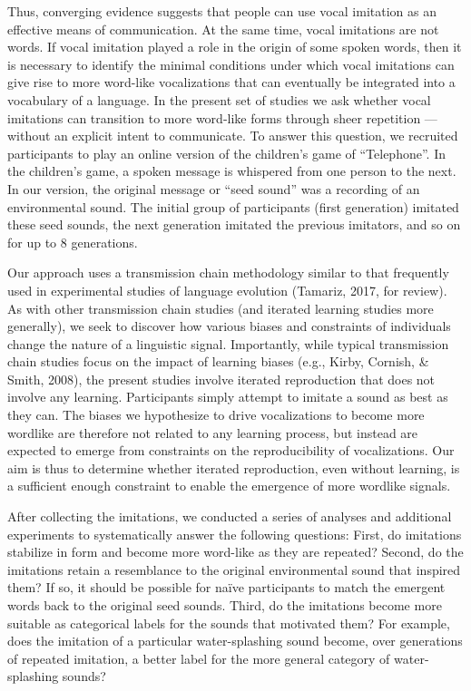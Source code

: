 \documentclass[english,floatsintext,man]{apa6}
\theoremstyle{definition}
\theoremstyle{definition}
\theoremstyle{definition}
\theoremstyle{remark}
\begin{document}
Thus, converging evidence suggests that people can use vocal imitation
as an effective means of communication. At the same time, vocal
imitations are not words. If vocal imitation played a role in the origin
of some spoken words, then it is necessary to identify the minimal
conditions under which vocal imitations can give rise to more word-like
vocalizations that can eventually be integrated into a vocabulary of a
language. In the present set of studies we ask whether vocal imitations
can transition to more word-like forms through sheer repetition ---
without an explicit intent to communicate. To answer this question, we
recruited participants to play an online version of the children's game
of \enquote{Telephone}. In the children's game, a spoken message is
whispered from one person to the next. In our version, the original
message or \enquote{seed sound} was a recording of an environmental
sound. The initial group of participants (first generation) imitated
these seed sounds, the next generation imitated the previous imitators,
and so on for up to 8 generations.

Our approach uses a transmission chain methodology similar to that
frequently used in experimental studies of language evolution (Tamariz,
2017, for review). As with other transmission chain studies (and
iterated learning studies more generally), we seek to discover how
various biases and constraints of individuals change the nature of a
linguistic signal. Importantly, while typical transmission chain studies
focus on the impact of learning biases (e.g., Kirby, Cornish, \& Smith,
2008), the present studies involve iterated reproduction that does not
involve any learning. Participants simply attempt to imitate a sound as
best as they can. The biases we hypothesize to drive vocalizations to
become more wordlike are therefore not related to any learning process,
but instead are expected to emerge from constraints on the
reproducibility of vocalizations. Our aim is thus to determine whether
iterated reproduction, even without learning, is a sufficient enough
constraint to enable the emergence of more wordlike signals.

After collecting the imitations, we conducted a series of analyses and
additional experiments to systematically answer the following questions:
First, do imitations stabilize in form and become more word-like as they
are repeated? Second, do the imitations retain a resemblance to the
original environmental sound that inspired them? If so, it should be
possible for naïve participants to match the emergent words back to the
original seed sounds. Third, do the imitations become more suitable as
categorical labels for the sounds that motivated them? For example, does
the imitation of a particular water-splashing sound become, over
generations of repeated imitation, a better label for the more general
category of water-splashing sounds?
\end{document}
